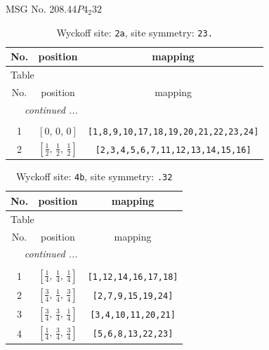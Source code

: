 \documentclass[fleqn,8pt]{jsarticle}
\begin{document}
\setcounter{MaxMatrixCols}{32}

\renewcommand{\tablename}{Table~}
\renewcommand{\figurename}{Figure~}
\begin{center}
\LARGE
MSG No. 208.44\quad$P4_{2}32$
\end{center}
\renewcommand{\arraystretch}{1.2}
\begin{longtable}{ccc}
\caption{Wyckoff site: {\tt 2a}, site symmetry: {\tt 23.}}
 \\
 \hline \hline
No. & position & mapping \\ \hline \endfirsthead

\multicolumn{2}{l}{\tablename\ \thetable{}} \\
 \hline \hline
No. & position & mapping \\ \hline \endhead

 \hline \hline
\multicolumn{2}{r}{\footnotesize\it continued ...} \\ \endfoot

 \hline \hline
\multicolumn{2}{r}{} \\ \endlastfoot

1 & $\left[ 0,\, 0,\, 0 \right]$ & {\tt [1,8,9,10,17,18,19,20,21,22,23,24]} \\ \hline
2 & $\left[ \frac{1}{2},\, \frac{1}{2},\, \frac{1}{2} \right]$ & {\tt [2,3,4,5,6,7,11,12,13,14,15,16]} \\
\end{longtable}
\renewcommand{\arraystretch}{1.2}
\begin{longtable}{ccc}
\caption{Wyckoff site: {\tt 4b}, site symmetry: {\tt .32}}
 \\
 \hline \hline
No. & position & mapping \\ \hline \endfirsthead

\multicolumn{2}{l}{\tablename\ \thetable{}} \\
 \hline \hline
No. & position & mapping \\ \hline \endhead

 \hline \hline
\multicolumn{2}{r}{\footnotesize\it continued ...} \\ \endfoot

 \hline \hline
\multicolumn{2}{r}{} \\ \endlastfoot

1 & $\left[ \frac{1}{4},\, \frac{1}{4},\, \frac{1}{4} \right]$ & {\tt [1,12,14,16,17,18]} \\ \hline
2 & $\left[ \frac{3}{4},\, \frac{1}{4},\, \frac{3}{4} \right]$ & {\tt [2,7,9,15,19,24]} \\ \hline
3 & $\left[ \frac{3}{4},\, \frac{3}{4},\, \frac{1}{4} \right]$ & {\tt [3,4,10,11,20,21]} \\ \hline
4 & $\left[ \frac{1}{4},\, \frac{3}{4},\, \frac{3}{4} \right]$ & {\tt [5,6,8,13,22,23]} \\
\end{longtable}
\end{document}
